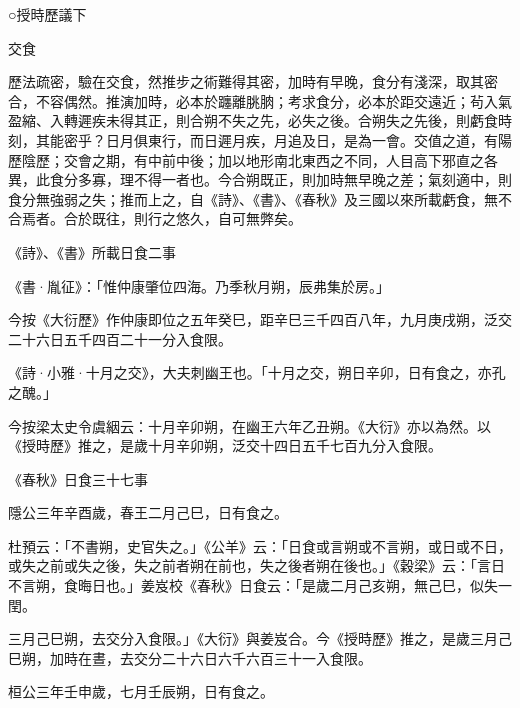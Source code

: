 
\begin{pinyinscope}

 ○授時歷議下



 交食



 歷法疏密，驗在交食，然推步之術難得其密，加時有早晚，食分有淺深，取其密合，不容偶然。推演加時，必本於躔離朓朒；考求食分，必本於距交遠近；茍入氣盈縮、入轉遲疾未得其正，則合朔不失之先，必失之後。合朔失之先後，則虧食時刻，其能密乎？日月俱東行，而日遲月疾，月追及日，是為一會。交值之道，有陽歷陰歷；交會之期，有中前中後；加以地形南北東西之不同，人目高下邪直之各異，此食分多寡，理不得一者也。今合朔既正，則加時無早晚之差；氣刻適中，則食分無強弱之失；推而上之，自《詩》、《書》、《春秋》及三國以來所載虧食，無不合焉者。合於既往，則行之悠久，自可無弊矣。



 《詩》、《書》所載日食二事



 《書·胤征》：「惟仲康肇位四海。乃季秋月朔，辰弗集於房。」



 今按《大衍歷》作仲康即位之五年癸巳，距辛巳三千四百八年，九月庚戌朔，泛交二十六日五千四百二十一分入食限。



 《詩·小雅·十月之交》，大夫刺幽王也。「十月之交，朔日辛卯，日有食之，亦孔之醜。」



 今按梁太史令虞絪云：十月辛卯朔，在幽王六年乙丑朔。《大衍》亦以為然。以《授時歷》推之，是歲十月辛卯朔，泛交十四日五千七百九分入食限。



 《春秋》日食三十七事



 隱公三年辛酉歲，春王二月己巳，日有食之。



 杜預云：「不書朔，史官失之。」《公羊》云：「日食或言朔或不言朔，或日或不日，或失之前或失之後，失之前者朔在前也，失之後者朔在後也。」《穀梁》云：「言日不言朔，食晦日也。」姜岌校《春秋》日食云：「是歲二月己亥朔，無己巳，似失一閏。



 三月己巳朔，去交分入食限。」《大衍》與姜岌合。今《授時歷》推之，是歲三月己巳朔，加時在晝，去交分二十六日六千六百三十一入食限。



 桓公三年壬申歲，七月壬辰朔，日有食之。




\end{pinyinscope}
